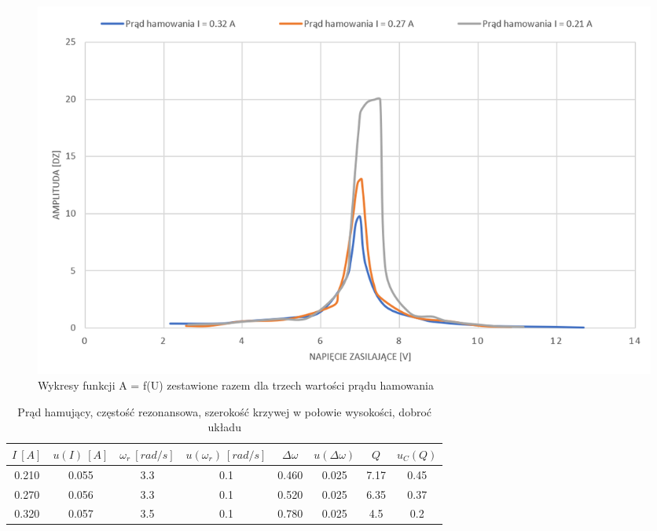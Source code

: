 \documentclass[12pt, a4paper, oneside]{article}
\begin{document}
\begin{figure}[h]
\centering
\caption{Wykresy funkcji A = f(U) zestawione razem dla trzech wartości prądu hamowania}
\includegraphics[scale=0.4]{f8.png}
\end{figure}
\begin{table}[h]
  \centering
  \caption{Prąd hamujący, częstość rezonansowa, szerokość krzywej w połowie wysokości, dobroć układu}
    \begin{tabular}{|c|c|c|c|c|c|c|c|}\hline
    $I~[A]$&$u(I)~[A]$&$\omega_r~[rad/s]$ & $u(\omega_r)~[rad/s]$ & $\Delta\omega$ & $u(\Delta\omega)$ & $Q$ & $u_C(Q)$ \\\hline
    0.210&0.055&3.3 & 0.1 & 0.460 & 0.025 & 7.17 & 0.45 \\\hline
    0.270&0.056&3.3 & 0.1 & 0.520 & 0.025 & 6.35 & 0.37 \\\hline
    0.320&0.057&3.5 & 0.1 & 0.780 & 0.025 & 4.5 & 0.2 \\\hline
    \end{tabular}%
  \label{tab:addlabel}%
\end{table}%


\clearpage
\end{document}
